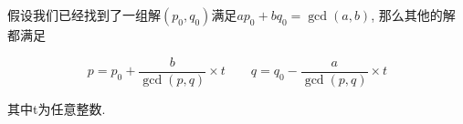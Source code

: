 假设我们已经找到了一组解$(p_0, q_0)$满足$a p_0 + b q_0 = \gcd(a,b)$, 那么其他的解都满足

$$p = p_0 + \frac b {\gcd(p, q)} \times t\quad\quad q = q_0 - \frac a {\gcd(p, q)} \times t$$

其中t为任意整数.